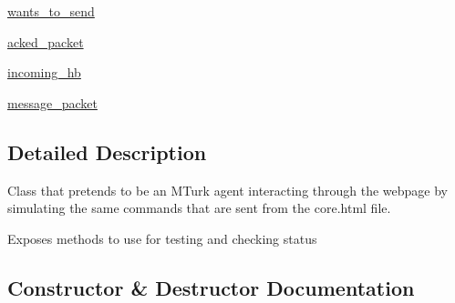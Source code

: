 \begin{DoxyCompactItemize}
\item 
\hyperlink{classparlai_1_1mturk_1_1core_1_1legacy__2018_1_1test_1_1test__full__system_1_1MockAgent_a1ef4f0d984c2623ad065a6221231ad1d}{wants\+\_\+to\+\_\+send}
\item 
\hyperlink{classparlai_1_1mturk_1_1core_1_1legacy__2018_1_1test_1_1test__full__system_1_1MockAgent_a37c64a2f56235c57623bcf0191691231}{acked\+\_\+packet}
\item 
\hyperlink{classparlai_1_1mturk_1_1core_1_1legacy__2018_1_1test_1_1test__full__system_1_1MockAgent_a97750b8b1110e029b4e82323576f5eb4}{incoming\+\_\+hb}
\item 
\hyperlink{classparlai_1_1mturk_1_1core_1_1legacy__2018_1_1test_1_1test__full__system_1_1MockAgent_ae10810ea77ff6a8322a3f25aa34fb4e5}{message\+\_\+packet}
\end{DoxyCompactItemize}


\subsection{Detailed Description}
\begin{DoxyVerb}Class that pretends to be an MTurk agent interacting through the webpage by
simulating the same commands that are sent from the core.html file.

Exposes methods to use for testing and checking status
\end{DoxyVerb}
 

\subsection{Constructor \& Destructor Documentation}
\mbox{\label{classparlai_1_1mturk_1_1core_1_1legacy__2018_1_1test_1_1test__full__system_1_1MockAgent_a43e345d7f00632635a5a8f782feda7ba}} 

